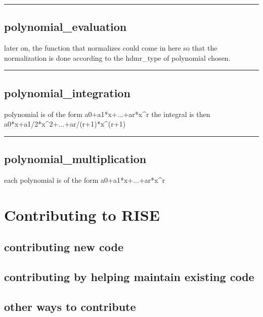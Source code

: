 \documentclass[letterpaper,10pt,english]{sphinxmanual}
\begin{document}
\bigskip\hrule{}\bigskip



\section{polynomial\_evaluation}
\label{classes/utils/@hdmr/hdmr:id6}\label{classes/utils/@hdmr/hdmr:polynomial-evaluation}
later on, the function that normalizes could come in here so that the
normalization is done according to the hdmr\_type of polynomial chosen.


\bigskip\hrule{}\bigskip



\section{polynomial\_integration}
\label{classes/utils/@hdmr/hdmr:id7}\label{classes/utils/@hdmr/hdmr:polynomial-integration}
polynomial is of the form a0+a1*x+...+ar*x\textasciicircum{}r
the integral is then a0*x+a1/2*x\textasciicircum{}2+...+ar/(r+1)*x\textasciicircum{}(r+1)


\bigskip\hrule{}\bigskip



\section{polynomial\_multiplication}
\label{classes/utils/@hdmr/hdmr:polynomial-multiplication}\label{classes/utils/@hdmr/hdmr:id8}
each polynomial is of the form a0+a1*x+...+ar*x\textasciicircum{}r


\chapter{Contributing to RISE}
\label{contributing:contributing-to-rise}\label{contributing::doc}

\section{contributing new code}
\label{contributing:contributing-new-code}

\section{contributing by helping maintain existing code}
\label{contributing:contributing-by-helping-maintain-existing-code}

\section{other ways to contribute}
\label{contributing:other-ways-to-contribute}
\end{document}
